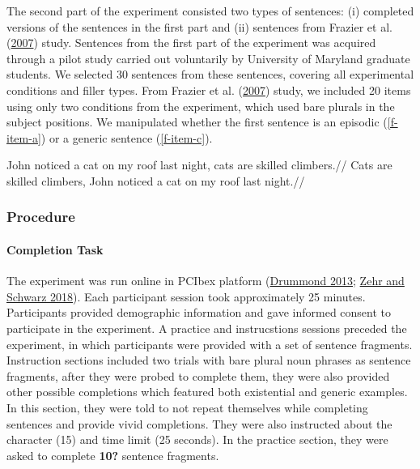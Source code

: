 \documentclass[
  10pt,
  letterpaper,
  DIV=11,
  numbers=noendperiod]{scrartcl}
\let\oldparagraph\paragraph
\renewcommand{\paragraph}[1]{\oldparagraph{#1}\mbox{}}
\begin{document}
The second part of the experiment consisted two types of sentences: (i)
completed versions of the sentences in the first part and (ii) sentences
from Frazier et al. (\protect\hyperlink{ref-FrazierEtAl2007}{2007})
study. Sentences from the first part of the experiment was acquired
through a pilot study carried out voluntarily by University of Maryland
graduate students. We selected 30 sentences from these sentences,
covering all experimental conditions and filler types. From Frazier et
al. (\protect\hyperlink{ref-FrazierEtAl2007}{2007}) study, we included
20 items using only two conditions from the experiment, which used bare
plurals in the subject positions. We manipulated whether the first
sentence is an episodic (\ref{f-item-a}) or a generic sentence
(\ref{f-item-c}).


\pex \a\label{f-item-a} \begingl \gla John noticed a cat on my roof last
night, cats are skilled climbers.// \endgl  \a\label{f-item-c}
\begingl \gla Cats are skilled climbers, John noticed a cat on my roof
last night.// \endgl  \xe

\hypertarget{procedure}{%
\subsubsection{Procedure}\label{procedure}}

\hypertarget{completion-task-1}{%
\paragraph{Completion Task}\label{completion-task-1}}

The experiment was run online in PCIbex platform
(\protect\hyperlink{ref-Drummond2013}{Drummond 2013};
\protect\hyperlink{ref-ZehrSchwarz2018}{Zehr and Schwarz 2018}). Each
participant session took approximately 25 minutes. Participants provided
demographic information and gave informed consent to participate in the
experiment. A practice and instrucstions sessions preceded the
experiment, in which participants were provided with a set of sentence
fragments. Instruction sections included two trials with bare plural
noun phrases as sentence fragments, after they were probed to complete
them, they were also provided other possible completions which featured
both existential and generic examples. In this section, they were told
to not repeat themselves while completing sentences and provide vivid
completions. They were also instructed about the character (15) and time
limit (25 seconds). In the practice section, they were asked to complete
\textbf{10?} sentence fragments.
\end{document}
